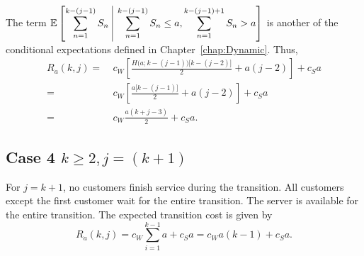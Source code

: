 The term $\displaystyle \mathbb{E} \left[ \sum_{n = 1}^{k - (j - 1)} S_{n} \ \vline \ \sum_{n = 1}^{k - (j - 1)} S_{n} \leq a, \sum_{n = 1}^{k - (j - 1) + 1} S_{n} > a \right]$ is another of the conditional expectations defined in Chapter~\ref{chap:Dynamic}. Thus,
\begin{equation}
	\begin{split}
		R_{a} (k, j)
		= & \ c_{W} \left[ \frac{H \big( a; k - (j - 1) \big) \big[ k - (j - 2) \big]}{2} + a (j - 2) \right] + c_{S} a \\
		= & \ c_{W} \left[ \frac{a \big[ k - (j - 1) \big]}{2} + a (j - 2) \right] + c_{S} a \\
		= & \ c_{W} \frac{a (k + j - 3)}{2} + c_{S} a.
	\end{split}
\end{equation}

\subsection{Case 4 $k \geq 2, j = (k + 1)$}
For $j = k + 1$, no customers finish service during the transition. All customers except the first customer wait for the entire transition. The server is available for the entire transition. The expected transition cost is given by
\begin{equation}
	R_{a} (k, j) = c_{W} \sum_{i = 1}^{k - 1} a + c_{S} a = c_{W} a (k - 1) + c_{S} a.
\end{equation}

